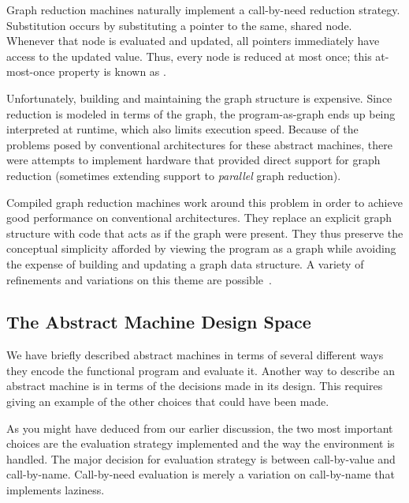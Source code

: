 Graph reduction machines naturally implement a call-by-need reduction strategy. Substitution occurs by substituting a pointer to the same, shared node. Whenever that node is evaluated and updated, all pointers immediately have access to the updated value. Thus, every node is reduced at most once; this at-most-once property is known as .

Unfortunately, building and maintaining the graph structure is expensive. Since reduction is modeled in terms of the graph, the program-as-graph ends up being interpreted at runtime, which also limits execution speed. Because of the problems posed by conventional architectures for these abstract machines, there were attempts to implement hardware that provided direct support for graph reduction (sometimes extending support to \emph{parallel} graph reduction).

Compiled graph reduction machines work around this problem in order to achieve good performance on conventional architectures. They replace an explicit graph structure with code that acts as if the graph were present. They thus preserve the conceptual simplicity afforded by viewing the program as a graph while avoiding the expense of building and updating a graph data structure. A variety of refinements and variations on this theme are possible~\citep{Johnsson:Efficient:2004,Burn:The-spineless:1988,Peyton-Jones:The-Spineless:1989,Reid:Putting:1999,Marlow:Faster:2007,Peyton-Jones:Call-pattern:2007}.

\subsection{The Abstract Machine Design Space}
We have briefly described abstract machines in terms of several different ways they encode the functional program and evaluate it. Another way to describe an abstract machine is in terms of the decisions made in its design. This requires giving an example of the other choices that could have been made.

As you might have deduced from our earlier discussion, the two most important choices are the evaluation strategy implemented and the way the environment is handled. The major decision for evaluation strategy is between call-by-value and call-by-name. Call-by-need evaluation is merely a variation on call-by-name that implements laziness.

